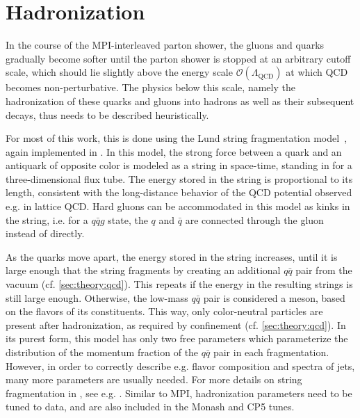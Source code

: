 \section{Hadronization}
\label{sec:mc:hadronization}

In the course of the MPI-interleaved parton shower, the gluons and quarks gradually become softer until the parton shower is stopped at an arbitrary cutoff scale, which should lie slightly above the energy scale $\mathcal{O}(\Lambda_{\mathrm{QCD}})$ at which QCD becomes non-perturbative.
The physics below this scale, namely 
the hadronization of these quarks and gluons into hadrons as well as their subsequent decays, thus needs to be described heuristically.

For most of this work, this is done using the Lund string fragmentation model~\cite{Andersson:1983ia,Sjostrand:1984ic}, again implemented in \pythia. In this model, the strong force between a quark and an antiquark of opposite color is modeled as a string in space-time, standing in for a three-dimensional flux tube. The energy stored in the string is proportional to its length, consistent with the long-distance behavior of the QCD potential observed e.g. in lattice QCD. Hard gluons can be accommodated in this model as kinks in the string, i.e. for a $q\bar{q}g$ state, the $q$ and $\bar{q}$ are connected through the gluon instead of directly.

As the quarks move apart, the energy stored in the string increases, until it is large enough that the string fragments by creating an additional $q\bar{q}$ pair from the vacuum (cf. \cref{sec:theory:qcd}). This repeats if the energy in the resulting strings is still large enough. Otherwise, the low-mass $q\bar{q}$ pair is considered a meson, based on the flavors of its constituents. This way, only color-neutral particles are present after hadronization, as required by confinement (cf. \cref{sec:theory:qcd}). In its purest form, this model has only two free parameters which parameterize the distribution of the momentum fraction of the $q\bar{q}$ pair in each fragmentation. However, in order to correctly describe e.g. flavor composition and \pt spectra of jets, many more parameters are usually needed. For more details on string fragmentation in \pythia, see e.g. . Similar to MPI, hadronization parameters need to be tuned to data, and are also included in the Monash and CP5 tunes.

